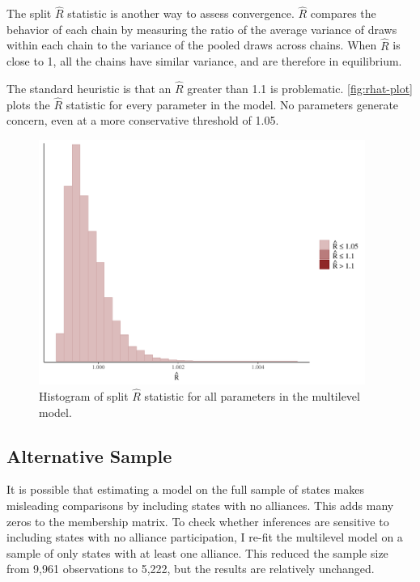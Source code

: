 \documentclass[12pt]{article}
\begin{document}
The split $\hat{R}$ statistic is another way to assess convergence. 
$\hat{R}$ compares the behavior of each chain by measuring the ratio of the average variance of draws within each chain to the variance of the pooled draws across chains. 
When $\hat{R}$ is close to 1, all the chains have similar variance, and are therefore in equilibrium. 


The standard heuristic is that an $\hat{R}$ greater than 1.1 is problematic. 
\autoref{fig:rhat-plot} plots the $\hat{R}$ statistic for every parameter in the model. 
No parameters generate concern, even at a more conservative threshold of 1.05. 


\begin{figure}[htbp]
	\centering
		\includegraphics[width=0.95\textwidth]{rhat-plot.pdf}
	\caption{Histogram of split $\hat{R}$ statistic for all parameters in the multilevel model.}
	\label{fig:rhat-plot}
\end{figure}
 



\subsection{Alternative Sample} 


It is possible that estimating a model on the full sample of states makes misleading comparisons by including states with no alliances.
This adds many zeros to the membership matrix. 
To check whether inferences are sensitive to including states with no alliance participation, I re-fit the multilevel model on a sample of only states with at least one alliance. 
This reduced the sample size from 9,961 observations to 5,222, but the results are relatively unchanged. 
\end{document}
